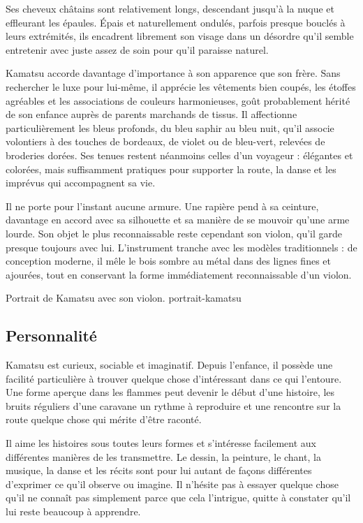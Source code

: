 Ses cheveux châtains sont relativement longs, descendant jusqu'à la nuque et
effleurant les épaules. Épais et naturellement ondulés, parfois presque
bouclés à leurs extrémités, ils encadrent librement son visage dans un
désordre qu'il semble entretenir avec juste assez de soin pour qu'il paraisse
naturel.

Kamatsu accorde davantage d'importance à son apparence que son frère. Sans
rechercher le luxe pour lui-même, il apprécie les vêtements bien coupés, les
étoffes agréables et les associations de couleurs harmonieuses, goût
probablement hérité de son enfance auprès de parents marchands de tissus.
Il affectionne particulièrement les bleus profonds, du bleu saphir au bleu
nuit, qu'il associe volontiers à des touches de bordeaux, de violet ou de
bleu-vert, relevées de broderies dorées. Ses tenues restent néanmoins celles
d'un voyageur : élégantes et colorées, mais suffisamment pratiques pour
supporter la route, la danse et les imprévus qui accompagnent sa vie.

Il ne porte pour l'instant aucune armure. Une rapière pend à sa ceinture,
davantage en accord avec sa silhouette et sa manière de se mouvoir qu'une
arme lourde. Son objet le plus reconnaissable reste cependant son violon,
qu'il garde presque toujours avec lui. L'instrument tranche avec les modèles
traditionnels : de conception moderne, il mêle le bois sombre au métal dans
des lignes fines et ajourées, tout en conservant la forme immédiatement
reconnaissable d'un violon.

  {Portrait de Kamatsu avec son violon.}
  {portrait-kamatsu}

\subsection*{Personnalité}

Kamatsu est curieux, sociable et imaginatif. Depuis l'enfance, il possède une
facilité particulière à trouver quelque chose d'intéressant dans ce qui
l'entoure. Une forme aperçue dans les flammes peut devenir le début d'une
histoire, les bruits réguliers d'une caravane un rythme à reproduire et une
rencontre sur la route quelque chose qui mérite d'être raconté.

Il aime les histoires sous toutes leurs formes et s'intéresse facilement aux
différentes manières de les transmettre. Le dessin, la peinture, le chant, la
musique, la danse et les récits sont pour lui autant de façons différentes
d'exprimer ce qu'il observe ou imagine. Il n'hésite pas à essayer quelque
chose qu'il ne connaît pas simplement parce que cela l'intrigue, quitte à
constater qu'il lui reste beaucoup à apprendre.

